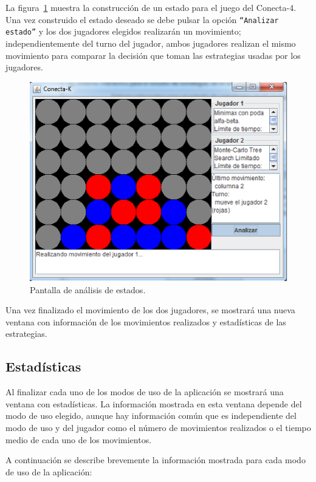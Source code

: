 La figura~\ref{fig:ventana_analisis} muestra la construcción de un estado para el juego del Conecta-4.
Una vez construido el estado deseado se debe pulsar la opción \texttt{``Analizar estado''} y los dos jugadores elegidos realizarán un movimiento; independientemente del turno del jugador, ambos jugadores realizan el mismo movimiento para comparar la decisión que toman las estrategias usadas por los jugadores.

\begin{figure}[!h]
	\centering
	\includegraphics[scale=0.5]{contenido/apendiceA/imagenes/ventanaAnalisis.eps}
	\caption{Pantalla de análisis de estados.}
	\label{fig:ventana_analisis}
\end{figure}

Una vez finalizado el movimiento de los dos jugadores, se mostrará una nueva ventana con información de los movimientos realizados y estadísticas de las estrategias.

\subsection{Estadísticas}
\label{ssec:ventana_estadisticas}
Al finalizar cada uno de los modos de uso de la aplicación se mostrará una ventana con estadísticas.
La información mostrada en esta ventana depende del modo de uso elegido, aunque hay información común que es independiente del modo de uso y del jugador como el número de movimientos realizados o el tiempo medio de cada uno de los movimientos.

A continuación se describe brevemente la información mostrada para cada modo de uso de la aplicación:

